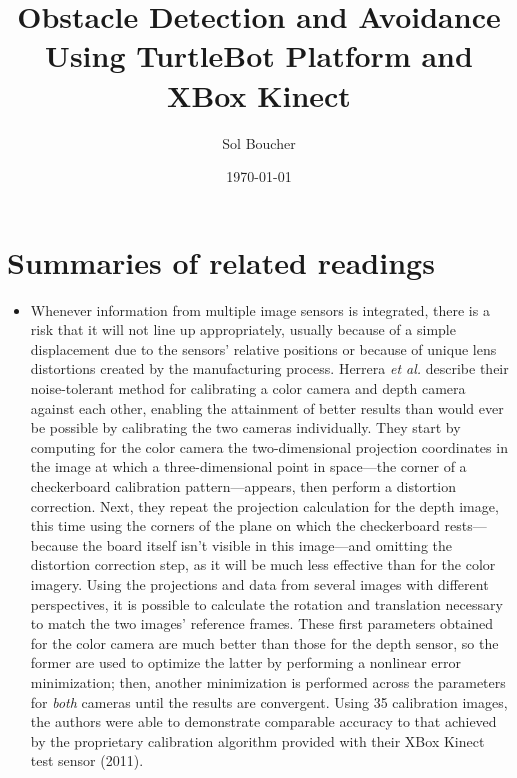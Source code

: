 \documentclass{article}
\title{Obstacle Detection and Avoidance Using TurtleBot Platform and XBox Kinect}
\author{Sol Boucher}
\date{\today}
\begin{document}
\maketitle

\section{Summaries of related readings}
\begin{itemize}
\item{Whenever information from multiple image sensors is integrated, there is a risk that it will not line up appropriately, usually because of a simple displacement due to the sensors' relative positions or because of unique lens distortions created by the manufacturing process.  Herrera \textit{et al.} describe their noise-tolerant method for calibrating a color camera and depth camera against each other, enabling the attainment of better results than would ever be possible by calibrating the two cameras individually.  They start by computing for the color camera the two-dimensional projection coordinates in the image at which a three-dimensional point in space---the corner of a checkerboard calibration pattern---appears, then perform a distortion correction.  Next, they repeat the projection calculation for the depth image, this time using the corners of the plane on which the checkerboard rests---because the board itself isn't visible in this image---and omitting the distortion correction step, as it will be much less effective than for the color imagery.  Using the projections and data from several images with different perspectives, it is possible to calculate the rotation and translation necessary to match the two images' reference frames.  These first parameters obtained for the color camera are much better than those for the depth sensor, so the former are used to optimize the latter by performing a nonlinear error minimization; then, another minimization is performed across the parameters for \textit{both} cameras until the results are convergent.  Using 35 calibration images, the authors were able to demonstrate comparable accuracy to that achieved by the proprietary calibration algorithm provided with their XBox Kinect test sensor (2011).}

\end{itemize}
\end{document}
